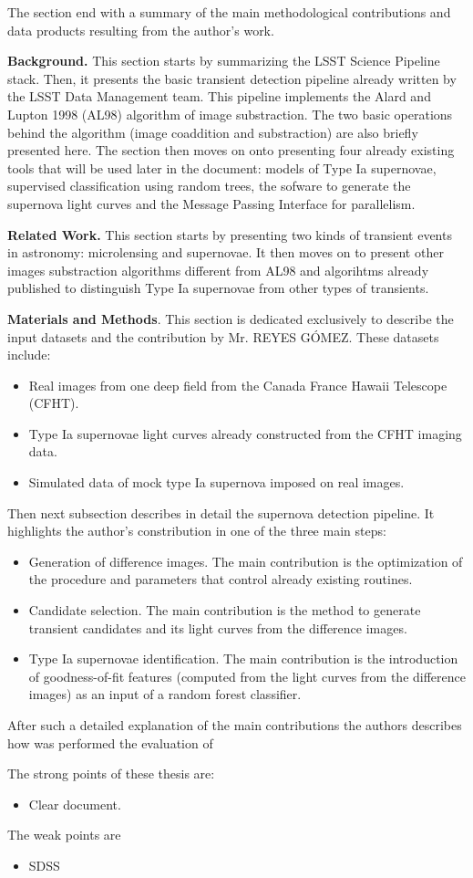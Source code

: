 \documentclass{article}
\begin{document}
The section end with a summary of the main methodological contributions and data products resulting from the author's work. 

{\bf Background.} This section starts by summarizing the
LSST Science Pipeline stack. Then, it presents the basic
transient detection pipeline already written by the LSST
Data Management team.
This pipeline implements the Alard and Lupton 1998 (AL98)
algorithm of image substraction. The two basic operations
behind the algorithm (image coaddition and substraction)
are also briefly presented here. The section then moves on
onto presenting four already existing  tools that will
be used later in the document: models of Type Ia
supernovae, supervised classification using random trees,
the sofware to generate the supernova light curves and the
Message Passing Interface for parallelism.

{\bf Related Work.} This section starts by presenting two kinds of transient events in astronomy: microlensing and supernovae. It then moves on to present other images substraction algorithms different from AL98 and algorihtms already published to distinguish Type Ia supernovae from other types of transients.

{\bf Materials and Methods}. This section is dedicated exclusively to describe the input datasets and the contribution by Mr. REYES G\'OMEZ. These datasets include:
\begin{itemize}
    \item Real images from one deep field from the Canada France Hawaii Telescope (CFHT).
    \item Type Ia supernovae light curves already constructed from the CFHT imaging data.
    \item Simulated data of mock type Ia supernova imposed on real images.
\end{itemize}
Then next subsection describes in detail the supernova detection pipeline. It highlights the author's constribution in one of the three main steps:
\begin{itemize}
    \item Generation of difference images. The main
    contribution is the optimization of the procedure and
    parameters that control already existing routines.
    \item Candidate selection. The main contribution is the method to generate transient candidates and its light curves from the difference images.
    \item Type Ia supernovae identification. The main 
    contribution is the introduction of goodness-of-fit
    features (computed from the light curves from the difference images) as an input of a random forest
    classifier.
\end{itemize}
After such a detailed explanation of the main contributions the authors describes how was performed the evaluation of 


The strong points of these thesis are:
\begin{itemize}
    \item Clear document.
\end{itemize}

The weak points are 
\begin{itemize}
    \item SDSS
\end{itemize}
\end{document}
